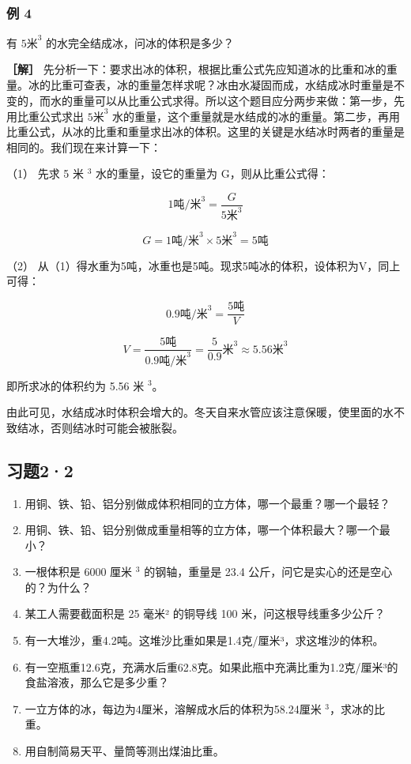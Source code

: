 \subsubsection{例 4}\label{ux4f8b-4}

有 \(5 \text{米}^{3}\) 的水完全结成冰，问冰的体积是多少？

\textbf{［解］}
先分析一下：要求出冰的体积，根据比重公式先应知道冰的比重和冰的重量。冰的比重可查表，冰的重量怎样求呢？冰由水凝固而成，水结成冰时重量是不变的，而水的重量可以从比重公式求得。所以这个题目应分两步来做：第一步，先用比重公式求出
\(5 \text{米}^{3}\)
水的重量，这个重量就是水结成的冰的重量。第二步，再用比重公式，从冰的比重和重量求出冰的体积。这里的关键是水结冰时两者的重量是相同的。我们现在来计算一下：

（1） 先求 5 米 \(^{3}\) 水的重量，设它的重量为 G，则从比重公式得：

\[
1 \text{吨} / \text{米} ^ {3} = \frac {G}{5 \text{米} ^ {3}}
\]

\[
G = 1 \text{吨} / \text{米} ^ {3} \times 5 \text{米} ^ {3} = 5 \text{吨}
\]

（2）
从（1）得水重为5吨，冰重也是5吨。现求5吨冰的体积，设体积为V，同上可得：

\[
0.9 \text{吨} / \text{米} ^ {3} = \frac {5 \text{吨}}{V}
\]

\[
V = \frac {5 \text{吨}}{0.9 \text{吨/米} ^ {3}} = \frac {5}{0.9} \text{米} ^ {3} \approx 5.56 \text{米} ^ {3}
\]

即所求冰的体积约为 5.56 米 \(^{3}\)。

由此可见，水结成冰时体积会增大的。冬天自来水管应该注意保暖，使里面的水不致结冰，否则结冰时可能会被胀裂。

\subsection{习题2·2}\label{ux4e60ux989822}

\begin{enumerate}
\def\labelenumi{\arabic{enumi}.}
\item
  用铜、铁、铅、铝分别做成体积相同的立方体，哪一个最重？哪一个最轻？
\item
  用铜、铁、铅、铝分别做成重量相等的立方体，哪一个体积最大？哪一个最小？
\item
  一根体积是 6000 厘米 \(^{3}\) 的钢轴，重量是 23.4
  公斤，问它是实心的还是空心的？为什么？
\item
  某工人需要截面积是 25 毫米² 的铜导线 100 米，问这根导线重多少公斤？
\item
  有一大堆沙，重4.2吨。这堆沙比重如果是1.4克/厘米³，求这堆沙的体积。
\item
  有一空瓶重12.6克，充满水后重62.8克。如果此瓶中充满比重为1.2克/厘米³的食盐溶液，那么它是多少重？
\item
  一立方体的冰，每边为4厘米，溶解成水后的体积为58.24厘米
  \(^{3}\)，求冰的比重。
\item
  用自制简易天平、量筒等测出煤油比重。
\end{enumerate}

